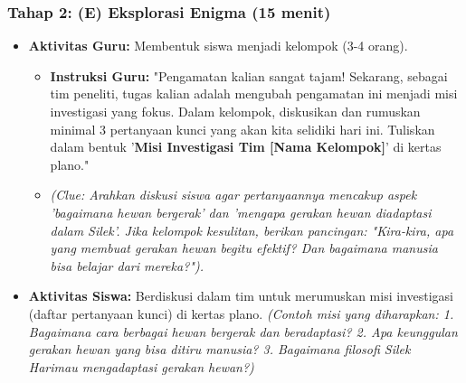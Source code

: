 \documentclass[a4paper,12pt]{article}
\begin{document}
\subsubsection{Tahap 2: (E) Eksplorasi Enigma (15 menit)}
\begin{itemize}
\item \textbf{Aktivitas Guru:} Membentuk siswa menjadi kelompok (3-4 orang).
    \begin{itemize}
    \item \textbf{Instruksi Guru:} "Pengamatan kalian sangat tajam! Sekarang, sebagai tim peneliti, tugas kalian adalah mengubah pengamatan ini menjadi misi investigasi yang fokus. Dalam kelompok, diskusikan dan rumuskan minimal 3 pertanyaan kunci yang akan kita selidiki hari ini. Tuliskan dalam bentuk '\textbf{Misi Investigasi Tim [Nama Kelompok]}' di kertas plano."
    \item \textit{(Clue: Arahkan diskusi siswa agar pertanyaannya mencakup aspek 'bagaimana hewan bergerak' dan 'mengapa gerakan hewan diadaptasi dalam Silek'. Jika kelompok kesulitan, berikan pancingan: "Kira-kira, apa yang membuat gerakan hewan begitu efektif? Dan bagaimana manusia bisa belajar dari mereka?").}
    \end{itemize}
\item \textbf{Aktivitas Siswa:} Berdiskusi dalam tim untuk merumuskan misi investigasi (daftar pertanyaan kunci) di kertas plano. \textit{(Contoh misi yang diharapkan: 1. Bagaimana cara berbagai hewan bergerak dan beradaptasi? 2. Apa keunggulan gerakan hewan yang bisa ditiru manusia? 3. Bagaimana filosofi Silek Harimau mengadaptasi gerakan hewan?)}
\end{itemize}
\end{document}
